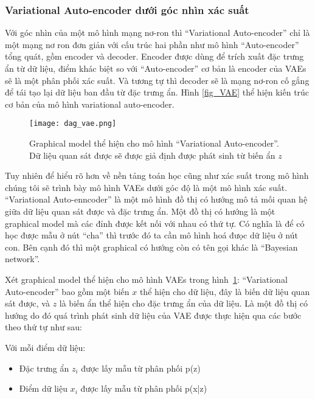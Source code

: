         \subsubsection{Variational Auto-encoder dưới góc nhìn xác suất}
        Với góc nhìn của một mô hình mạng nơ-ron thì ``Variational Auto-encoder'' chỉ là một mạng nơ ron đơn giản với cấu trúc hai phần như mô hình ``Auto-encoder'' tổng quát, gồm encoder và decoder. 
        Encoder được dùng để trích xuất đặc trưng ẩn từ dữ liệu, điểm khác biệt so với ``Auto-encoder'' cơ bản là encoder của VAEs sẽ là một phân phối xác suất.
        Và tương tự thì decoder sẽ là mạng nơ-ron cố gắng để tái tạo lại dữ liệu ban đầu từ đặc trưng ẩn.
        Hình \ref{fig_VAE} thể hiện kiến trúc cơ bản của mô hình variational auto-encoder.


        \begin{figure}
            \centering
            \texttt{[image: dag\_vae.png]}
            \caption{Graphical model thể hiện cho mô hình ``Variational Auto-encoder''. Dữ liệu quan sát được sẽ được giả định được phát sinh từ biến ẩn $z$} 
            \label{fig_dag_vae}
        \end{figure}

        Tuy nhiên để hiểu rõ hơn về nền tảng toán học cũng như xác suất trong mô hình chúng tôi sẽ trình bày mô hình VAEs dưới góc độ là một mô hình xác suất.
        ``Variational Auto-enncoder'' là một mô hình đồ thị có hướng mô tả mối quan hệ giữa dữ liệu quan sát được và đặc trưng ẩn. Một đồ thị có hướng là một graphical model mà các đỉnh được kết nối với nhau có thứ tự. Có nghĩa là để có học được mẫu ở nút ``cha'' thì trước đó ta cần mô hình hoá đưọc dữ liệu ở nút con. Bên cạnh đó thì một graphical có hướng còn có tên gọi khác là ``Bayesian network''.
 
        
        Xét graphical model thể hiện cho mô hình VAEs trong hình~\ref{fig_dag_vae}:
        ``Variational Auto-encoder'' bao gồm một biến $x$ thể hiện cho dữ liệu, đây là biến dữ liệu quan sát được, và $z$ là biến ẩn thể hiện cho đặc trưng ẩn của dữ liệu. 
        Là một đồ thị có hướng do đó quá trình phát sinh dữ liệu của VAE được thực hiện qua các bước theo thứ tự như sau: 
        
        Với mỗi điểm dữ liệu: 
        \begin{itemize}
            \item Đặc trưng ẩn $z_i$ được lấy mẫu từ phân phối p(z)
            \item Điểm dữ liệu $x_i$ được lấy mẫu từ phân phối p(x|z)
        \end{itemize}

